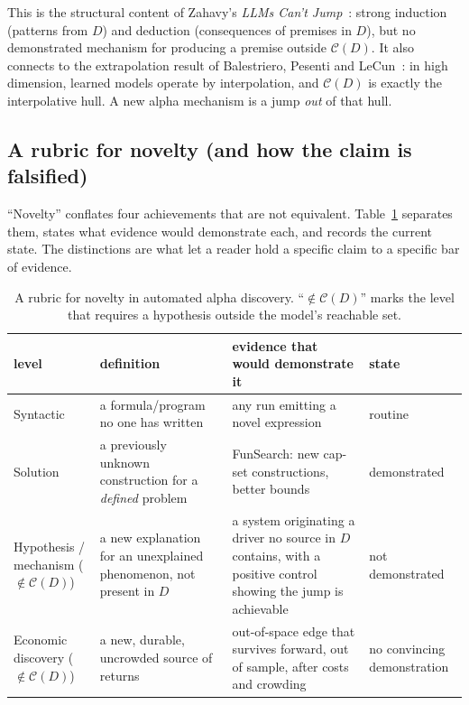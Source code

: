 This is the structural content of Zahavy's \emph{LLMs Can't Jump}~\cite{zahavy}: strong induction
(patterns from $D$) and deduction (consequences of premises in $D$), but no demonstrated mechanism
for producing a premise outside $\mathcal{C}(D)$. It also connects to the extrapolation
result of Balestriero, Pesenti and LeCun~\cite{lecun}: in high dimension, learned models operate by
interpolation, and $\mathcal{C}(D)$ is exactly the interpolative hull. A new alpha mechanism is a
jump \emph{out} of that hull.

\subsection{A rubric for novelty (and how the claim is falsified)}
\label{sec:rubric}

``Novelty'' conflates four achievements that are not equivalent. Table~\ref{tab:rubric} separates
them, states what evidence would demonstrate each, and records the current state. The
distinctions are what let a reader hold a specific claim to a specific bar of evidence.

\begin{table}[htbp]
\centering
\caption{A rubric for novelty in automated alpha discovery. ``$\notin \mathcal{C}(D)$'' marks the
level that requires a hypothesis outside the model's reachable set.}
\label{tab:rubric}
\small
\begin{tabular}{@{}p{2.4cm} p{4.0cm} p{4.0cm} p{2.6cm}@{}}
\toprule
level & definition & evidence that would demonstrate it & state \\
\midrule
Syntactic & a formula/program no one has written & any run emitting a novel expression & routine \\[2pt]
Solution & a previously unknown construction for a \emph{defined} problem & FunSearch: new cap-set constructions, better bounds~\cite{funsearch} & demonstrated \\[2pt]
Hypothesis / mechanism ($\notin \mathcal{C}(D)$) & a new explanation for an unexplained phenomenon, not present in $D$ & a system originating a driver no source in $D$ contains, with a positive control showing the jump is achievable & not demonstrated \\[2pt]
Economic discovery ($\notin \mathcal{C}(D)$) & a new, durable, uncrowded source of returns & out-of-space edge that survives forward, out of sample, after costs and crowding & no convincing demonstration \\
\bottomrule
\end{tabular}
\end{table}

